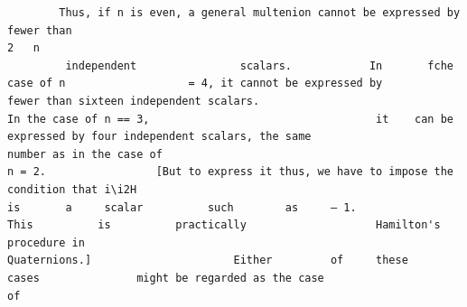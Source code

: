 \documentclass[10pt]{article}
\begin{document}
\begin{verbatim}
        Thus, if n is even, a general multenion cannot be expressed by fewer than
2   n
         independent                scalars.            In       fche        case of n                   = 4, it cannot be expressed by
fewer than sixteen independent scalars.                                                                In the case of n == 3,                                   it    can be
expressed by four independent scalars, the same                                                                             number as in the case of
n = 2.                 [But to express it thus, we have to impose the condition that i\i2H
is       a     scalar          such        as     — 1.             This          is          practically                    Hamilton's procedure in
Quaternions.]                      Either         of     these           cases               might be regarded as the case                                                  of


\end{verbatim}
\clearpage
\end{document}
